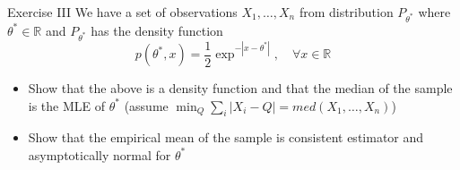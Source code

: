 \documentclass{beamer}
\begin{document}
\begin{frame}{Exercise III} 
We have a set of observations $X_1, \ldots, X_n$ from distribution $P_{\theta^*}$ where $\theta^* \in \mathbb{R}$ and  $P_{\theta^*}$ has the density function 
\begin{displaymath} 
p(\theta^*, x) = \frac{1}{2} \exp^{-|x - \theta^*|}, \quad \forall x \in \mathbb{R} 
\end{displaymath}
\begin{itemize} 
 \item Show that the above is a density function and that the median of the sample is the MLE of $\theta^*$ (assume $\min_Q \sum_i |X_i - Q| = med(X_1,\ldots,X_n)$)  
 \item Show that the empirical mean of the sample is consistent estimator and asymptotically normal for $\theta^*$ 
\end{itemize}
\end{frame}
\end{document}
